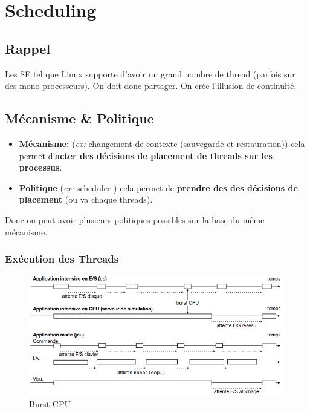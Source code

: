 \section{Scheduling}\label{scheduling}

\subsection{Rappel}\label{rappel}

Les SE tel que Linux supporte d'avoir un grand nombre de thread (parfois
sur des mono-processeurs). On doit donc partager. On crée l'illusion de
continuité.

\subsection{Mécanisme \& Politique}\label{muxe9canisme-politique}

\begin{itemize}
\tightlist
\item
  \textbf{Mécanisme:} (\emph{ex:} changement de contexte (sauvegarde et
  restauration)) cela permet d'\textbf{acter des décisions de placement
  de threads sur les processus}.
\item
  \textbf{Politique} (\emph{ex:} scheduler ) cela permet de
  \textbf{prendre des des décisions de placement} (ou va chaque
  threads).
\end{itemize}

Donc on peut avoir plusieurs politiques possibles sur la base du même
mécanisme.

\subsubsection{Exécution des Threads}\label{exuxe9cution-des-threads}

\begin{figure}
\centering
\includegraphics{image-28.png}
\caption{Burst CPU}
\end{figure}

